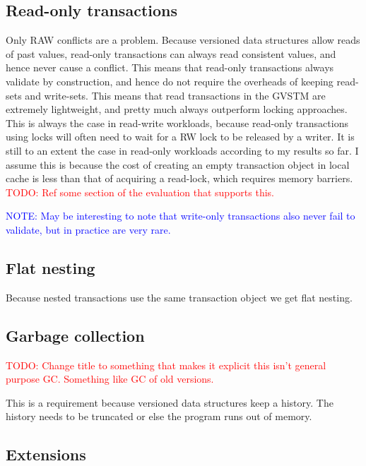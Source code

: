 \documentclass[12pt,a4paper,oneside,openright]{report}
\newcommand{\todo}[1]{\textcolor{red}{TODO: #1}}
\newcommand{\note}[1]{\textcolor{blue}{NOTE: #1}}
\begin{document}
\subsection{Read-only transactions}
\label{sec:impl:read-only-trans}

Only RAW conflicts are a problem. Because versioned data structures
allow reads of past values, read-only transactions can always read
consistent values, and hence never cause a conflict. This means that
read-only transactions always validate by construction, and hence do
not require the overheads of keeping read-sets and write-sets. This
means that read transactions in the GVSTM are extremely lightweight,
and pretty much always outperform locking approaches. This is always
the case in read-write workloads, because read-only transactions using
locks will often need to wait for a RW lock to be released by a
writer. It is still to an extent the case in read-only workloads
according to my results so far. I assume this is because the cost of
creating an empty transaction object in local cache is less than that
of acquiring a read-lock, which requires memory barriers.  \todo{Ref
  some section of the evaluation that supports this.}

\note{May be interesting to note that write-only transactions also
  never fail to validate, but in practice are very rare.}

\subsection{Flat nesting}
\label{sec:impl:flat-nesting}

Because nested transactions use the same transaction object we get
flat nesting.

\subsection{Garbage collection}
\label{sec:impl:garbage-collection}

\todo{Change title to something that makes it explicit this isn't
  general purpose GC. Something like GC of old versions.}

This is a requirement because versioned data structures keep a
history. The history needs to be truncated or else the program runs
out of memory.

\subsection{Extensions}
\label{sec:impl:extensions}
\end{document}

